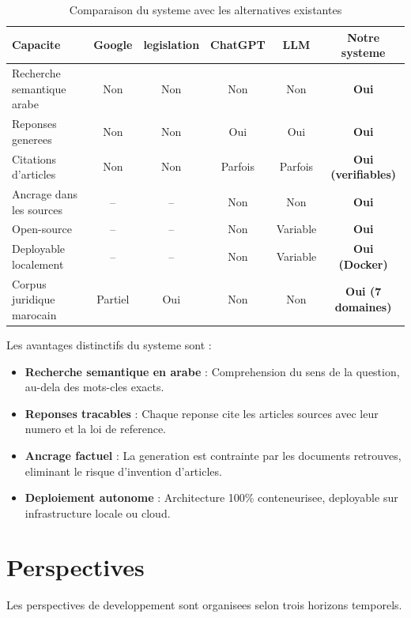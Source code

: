 \begin{table}[h]
\centering
\renewcommand{\arraystretch}{1.3}
\begin{tabular}{|l|c|c|c|c|c|}
\hline
\rowcolor{LightBlue}
\textbf{\color{PrimaryBlue}Capacite} & \textbf{\color{PrimaryBlue}Google} & \textbf{\color{PrimaryBlue}legislation} & \textbf{\color{PrimaryBlue}ChatGPT } & \textbf{\color{PrimaryBlue}LLM } & \textbf{\color{PrimaryBlue}Notre systeme} \\
\hline
Recherche semantique arabe & Non & Non & Non & Non & \textbf{Oui} \\
Reponses generees & Non & Non & Oui & Oui & \textbf{Oui} \\
Citations d'articles & Non & Non & Parfois  & Parfois  & \textbf{Oui (verifiables)} \\
Ancrage dans les sources & -- & -- & Non & Non & \textbf{Oui} \\
Open-source & -- & -- & Non & Variable & \textbf{Oui} \\
Deployable localement & -- & -- & Non & Variable & \textbf{Oui (Docker)} \\
Corpus juridique marocain & Partiel & Oui & Non & Non & \textbf{Oui (7 domaines)} \\
\hline
\end{tabular}
\caption{Comparaison du systeme avec les alternatives existantes}
\label{tab:comparaison}
\end{table}

Les avantages distinctifs du systeme sont :
\begin{itemize}
    \item \textbf{Recherche semantique en arabe} : Comprehension du sens de la question, au-dela des mots-cles exacts.
    \item \textbf{Reponses tracables} : Chaque reponse cite les articles sources avec leur numero et la loi de reference.
    \item \textbf{Ancrage factuel} : La generation est contrainte par les documents retrouves, eliminant le risque d'invention d'articles.
    \item \textbf{Deploiement autonome} : Architecture 100\% conteneurisee, deployable sur infrastructure locale ou cloud.
\end{itemize}

\section{Perspectives}

Les perspectives de developpement sont organisees selon trois horizons temporels.


